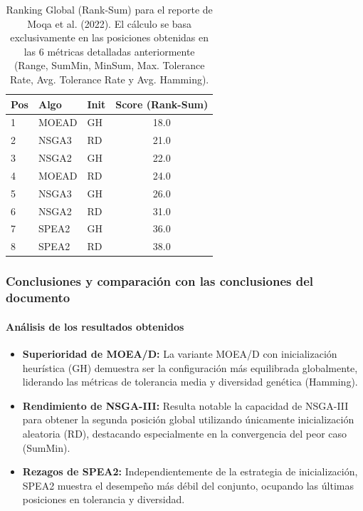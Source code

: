 \documentclass[a4paper,10pt]{article} %
\begin{document}
\begin{table}[H]
    \centering
    \begin{tabular}{lllc}
        \toprule
        Pos & Algo & Init & Score (Rank-Sum) \\
        \midrule
        1 & MOEAD & GH & 18.0 \\
        2 & NSGA3 & RD & 21.0 \\
        3 & NSGA2 & GH & 22.0 \\
        4 & MOEAD & RD & 24.0 \\
        5 & NSGA3 & GH & 26.0 \\
        6 & NSGA2 & RD & 31.0 \\
        7 & SPEA2 & GH & 36.0 \\
        8 & SPEA2 & RD & 38.0 \\
        \bottomrule
    \end{tabular}
    \caption{Ranking Global (Rank-Sum) para el reporte de Moqa et al. (2022). El cálculo se basa exclusivamente en las posiciones obtenidas en las 6 métricas detalladas anteriormente (Range, SumMin, MinSum, Max. Tolerance Rate, Avg. Tolerance Rate y Avg. Hamming).}
\end{table}


\subsubsection{Conclusiones y comparación con las conclusiones del documento}

\paragraph{Análisis de los resultados obtenidos}
\begin{itemize}
    \item \textbf{Superioridad de MOEA/D:} La variante MOEA/D con inicialización heurística (GH) demuestra ser la configuración más equilibrada globalmente, liderando las métricas de tolerancia media y diversidad genética (Hamming).
    \item \textbf{Rendimiento de NSGA-III:} Resulta notable la capacidad de NSGA-III para obtener la segunda posición global utilizando únicamente inicialización aleatoria (RD), destacando especialmente en la convergencia del peor caso (SumMin).
    \item \textbf{Rezagos de SPEA2:} Independientemente de la estrategia de inicialización, SPEA2 muestra el desempeño más débil del conjunto, ocupando las últimas posiciones en tolerancia y diversidad.
\end{itemize}
\end{document}
